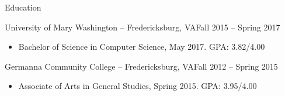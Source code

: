 \documentclass[calibri]{mcdowellcv}
\begin{document}
	\begin{cvsection}{Education}
		\begin{cvsubsection}{University of Mary Washington -- Fredericksburg, VA}{Fall 2015 -- Spring 2017}
			\begin{itemize}
				\item Bachelor of Science in Computer Science, May 2017. GPA: 3.82/4.00
			\end{itemize}
		\end{cvsubsection}
		\begin{cvsubsection}{Germanna Community College -- Fredericksburg, VA}{Fall 2012 -- Spring 2015}
			\begin{itemize}
				\item Associate of Arts in General Studies, Spring 2015. GPA: 3.95/4.00
			\end{itemize}
		\end{cvsubsection}
	\end{cvsection}
	
\end{document}
